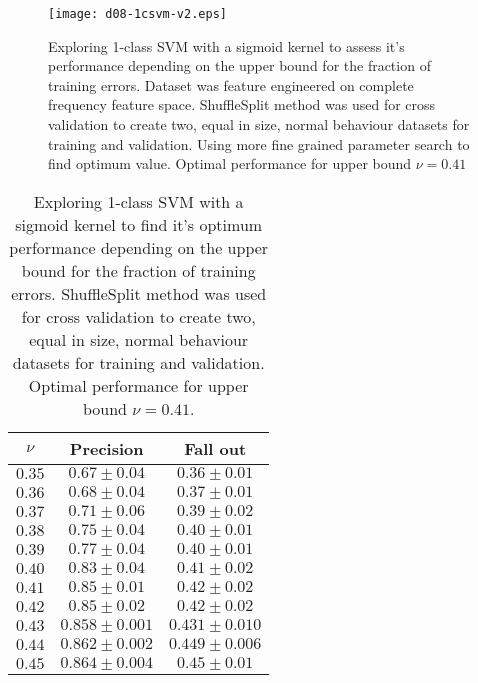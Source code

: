\documentclass[reqno,openany,12pt]{amsbook}
\begin{document}
\begin{figure}[thb]
\texttt{[image: d08-1csvm-v2.eps]}
\caption[1-class SVM performance depending on bound for training errors]{Exploring 1-class SVM with a sigmoid kernel to assess it's performance depending on the upper bound for the fraction of training errors. Dataset was feature engineered on complete frequency feature space. ShuffleSplit method was used for cross validation to create two, equal in size, normal behaviour datasets for training and validation. Using more fine grained parameter search to find optimum value. Optimal performance for upper bound $\nu = 0.41$ }
\label{1csvm-fr2}
\end{figure}
\begin{table}
\begin{tabular}{|c|c|c|}
\hline
$\nu$ &  Precision & Fall out \\ \hline 
$0.35$ &  $0.67 \pm 0.04$ & $0.36 \pm 0.01$ \\ \hline 
$0.36$ &  $0.68 \pm 0.04$ & $0.37 \pm 0.01$ \\ \hline 
$0.37$ &  $0.71 \pm 0.06$ & $0.39 \pm 0.02$ \\ \hline 
$0.38$ &  $0.75 \pm 0.04$ & $0.40 \pm 0.01$ \\ \hline 
$0.39$ &  $0.77 \pm 0.04$ & $0.40 \pm 0.01$ \\ \hline 
$0.40$ &  $0.83 \pm 0.04$ & $0.41 \pm 0.02$ \\ \hline 
$0.41$ &  $0.85 \pm 0.01$ & $0.42 \pm 0.02$ \\ \hline 
$0.42$ &  $0.85 \pm 0.02$ & $0.42 \pm 0.02$ \\ \hline 
$0.43$ &  $0.858 \pm 0.001$ & $0.431 \pm 0.010$ \\ \hline
$0.44$ &  $0.862 \pm 0.002$ & $0.449 \pm 0.006$ \\ \hline
$0.45$ &  $0.864 \pm 0.004$ & $0.45 \pm 0.01$ \\ \hline
\end{tabular}
\vspace{5pt}
\caption[Finding optimum 1-class SVM performance depending on bound for training errors]{Exploring 1-class SVM with a sigmoid kernel to find it's optimum performance depending on the upper bound for the fraction of training errors. ShuffleSplit method was used for cross validation to create two, equal in size, normal behaviour datasets for training and validation. Optimal performance for upper bound $\nu = 0.41$.}
\label{1csvmt2}
\end{table}
\end{document}
